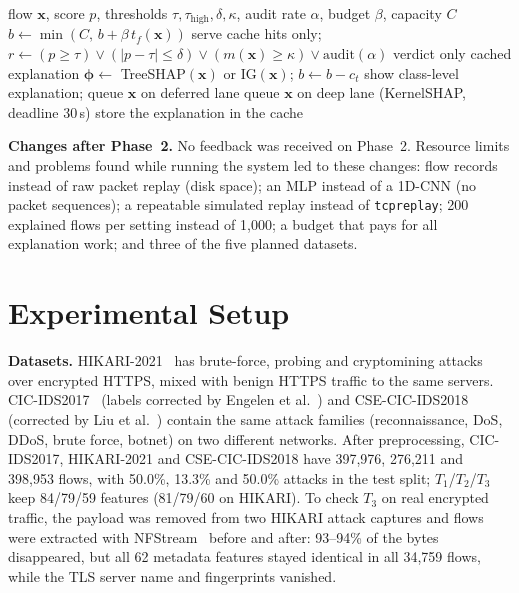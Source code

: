 \documentclass[pdflatex,iicol,sn-mathphys-num]{sn-jnl}
\begin{document}
\begin{algorithm}[!t]
\caption{Budget-aware selective explanation (per flow)}\label{alg:trigger}
\footnotesize
\begin{algorithmic}[1]
\Require flow $\mathbf{x}$, score $p$, thresholds $\tau,\tau_{\mathrm{high}},\delta,\kappa$, audit rate $\alpha$, budget $\beta$, capacity $C$
\State $b\gets\min(C,\,b+\beta\,t_f(\mathbf{x}))$ 
 serve cache hits only; \Return \EndIf
\State $r\gets(p\ge\tau)\lor(|p-\tau|\le\delta)\lor(m(\mathbf{x})\ge\kappa)\lor\mathrm{audit}(\alpha)$
 \Return verdict only \EndIf
{} \Return cached explanation \EndIf
{}
  \State $\boldsymbol{\phi}\gets$ TreeSHAP$(\mathbf{x})$ or IG$(\mathbf{x})$; $b\gets b-c_t$ 
\Else
  \State show class-level explanation; queue $\mathbf{x}$ on deferred lane
\EndIf
{}
  \State queue $\mathbf{x}$ on deep lane (KernelSHAP, deadline 30\,s)
\EndIf
\State store the explanation in the cache
\end{algorithmic}
\end{algorithm}

\textbf{Changes after Phase~2.} No feedback was received on Phase~2. Resource limits and problems found while running the system led to these changes: flow records instead of raw packet replay (disk space); an MLP instead of a 1D-CNN (no packet sequences); a repeatable simulated replay instead of \texttt{tcpreplay}; 200 explained flows per setting instead of 1{,}000; a budget that pays for all explanation work; and three of the five planned datasets.

\section{Experimental Setup}\label{sec:setup}

\textbf{Datasets.} HIKARI-2021~\cite{hikari} has brute-force, probing and cryptomining attacks over encrypted HTTPS, mixed with benign HTTPS traffic to the same servers. CIC-IDS2017~\cite{cicids2017} (labels corrected by Engelen et al.~\cite{engelen2021}) and CSE-CIC-IDS2018 (corrected by Liu et al.~\cite{liu2022error}) contain the same attack families (reconnaissance, DoS, DDoS, brute force, botnet) on two different networks. After preprocessing, CIC-IDS2017, HIKARI-2021 and CSE-CIC-IDS2018 have 397{,}976, 276{,}211 and 398{,}953 flows, with 50.0\%, 13.3\% and 50.0\% attacks in the test split; $T_1$/$T_2$/$T_3$ keep 84/79/59 features (81/79/60 on HIKARI). To check $T_3$ on real encrypted traffic, the payload was removed from two HIKARI attack captures and flows were extracted with NFStream~\cite{nfstream} before and after: 93--94\% of the bytes disappeared, but all 62 metadata features stayed identical in all 34{,}759 flows, while the TLS server name and fingerprints vanished.
\end{document}
